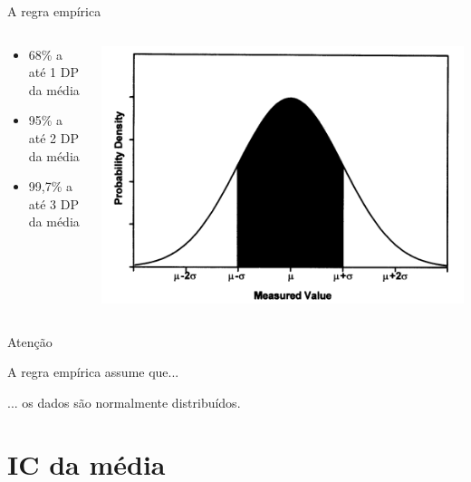 \documentclass{beamer}
\begin{document}
\begin{frame}{\scriptsize A regra empírica}
  \begin{columns}
    \begin{column}{5cm}
      \begin{itemize}
        \footnotesize
      \item 68\% a até 1 DP da média
        \medskip
      \item 95\% a até 2 DP da média
        \medskip
      \item 99,7\% a até 3 DP da média
      \end{itemize}
    \end{column}
    \begin{column}{5cm}
      \includegraphics[width=\textwidth]{Cap4/empirica}
    \end{column}
  \end{columns}
\end{frame}

\begin{frame}{\scriptsize Atenção}
  \begin{block}{}
    \begin{center}
      \Large
      A regra empírica assume que...

      \bigskip
      ... os dados são normalmente distribuídos.
    \end{center}
  \end{block}
\end{frame}

\section{IC da média}
\end{document}
